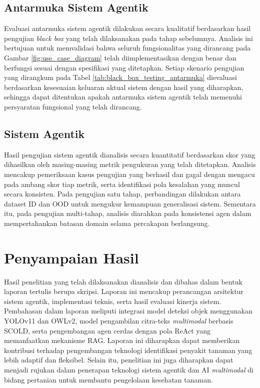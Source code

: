 \subsection{Antarmuka Sistem Agentik}
Evaluasi antarmuka sistem agentik dilakukan secara kualitatif berdasarkan hasil pengujian \textit{black box} yang telah dilaksanakan pada tahap sebelumnya. Analisis ini bertujuan untuk memvalidasi bahwa seluruh fungsionalitas yang dirancang pada Gambar \ref{fig:use_case_diagram} telah diimplementasikan dengan benar dan berfungsi sesuai dengan spesifikasi yang ditetapkan. Setiap skenario pengujian yang dirangkum pada Tabel \ref{tab:black_box_testing_antarmuka} dievaluasi berdasarkan kesesuaian keluaran aktual sistem dengan hasil yang diharapkan, sehingga dapat ditentukan apakah antarmuka sistem agentik telah memenuhi persyaratan fungsional yang telah dirancang.

\subsection{Sistem Agentik}
Hasil pengujian sistem agentik dianalisis secara kuantitatif berdasarkan skor yang dihasilkan oleh masing-masing metrik pengukuran yang telah ditetapkan. Analisis mencakup pemeriksaan kasus pengujian yang berhasil dan gagal dengan mengacu pada ambang skor tiap metrik, serta identifikasi pola kesalahan yang muncul secara konsisten. Pada pengujian satu tahap, perbandingan dilakukan antara dataset ID dan OOD untuk mengukur kemampuan generalisasi sistem. Sementara itu, pada pengujian multi-tahap, analisis diarahkan pada konsistensi agen dalam mempertahankan batasan domain selama percakapan berlangsung.

\section{Penyampaian Hasil}
Hasil penelitian yang telah dilaksanakan dianalisis dan dibahas dalam bentuk laporan tertulis berupa skripsi. Laporan ini mencakup perancangan arsitektur sistem agentik, implementasi teknis, serta hasil evaluasi kinerja sistem. Pembahasan dalam laporan meliputi integrasi model deteksi objek menggunakan YOLOv11 dan OWLv2, model pengambilan citra-teks \textit{multimodal} berbasis SCOLD, serta pengembangan agen cerdas dengan pola ReAct yang memanfaatkan mekanisme RAG. Laporan ini diharapkan dapat memberikan kontribusi terhadap pengembangan teknologi identifikasi penyakit tanaman yang lebih adaptif dan fleksibel. Selain itu, penelitian ini juga diharapkan dapat menjadi rujukan dalam penerapan teknologi sistem agentik dan AI \textit{multimodal} di bidang pertanian untuk membantu pengelolaan kesehatan tanaman.